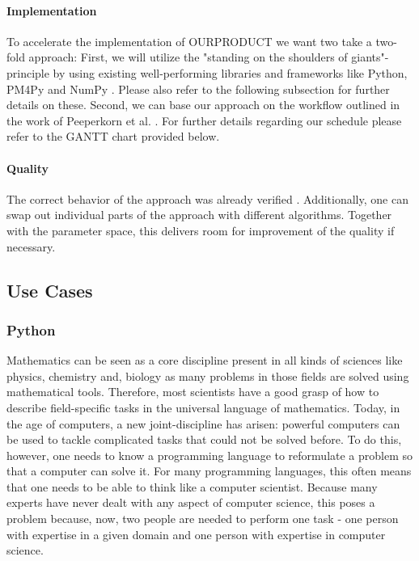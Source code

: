 \documentclass{article}
\begin{document}
\paragraph{Implementation} To accelerate the implementation of OURPRODUCT we want two take a two-fold approach:
First, we will utilize the "standing on the shoulders of giants"-principle by using existing well-performing libraries and frameworks like Python, PM4Py \cite{pm4py} and NumPy \cite{numpy}.
Please also refer to the following subsection for further details on these.
Second, we can base our approach on the workflow outlined in the work of Peeperkorn et al. \cite{source}.
For further details regarding our schedule please refer to the GANTT chart provided below.

\paragraph{Quality} The correct behavior of the approach was already verified \cite{source}.
Additionally, one can swap out individual parts of the approach with different algorithms.
Together with the parameter space, this delivers room for improvement of the quality if necessary.

\subsection{Use Cases}

\subsubsection{Python}

Mathematics can be seen as a core discipline present in all kinds of sciences like physics, chemistry and, biology as many problems in those fields are solved using mathematical tools. Therefore, most scientists have a good grasp of how to describe field-specific tasks in the universal language of mathematics. Today, in the age of computers, a new joint-discipline has arisen: powerful computers can be used to tackle complicated tasks that could not be solved before. To do this, however, one needs to know a programming language to reformulate a problem so that a computer can solve it. For many programming languages, this often means that one needs to be able to think like a computer scientist. Because many experts have never dealt with any aspect of computer science, this poses a problem because, now, two people are needed to perform one task - one person with expertise in a given domain and one person with expertise in computer science. 
\end{document}
